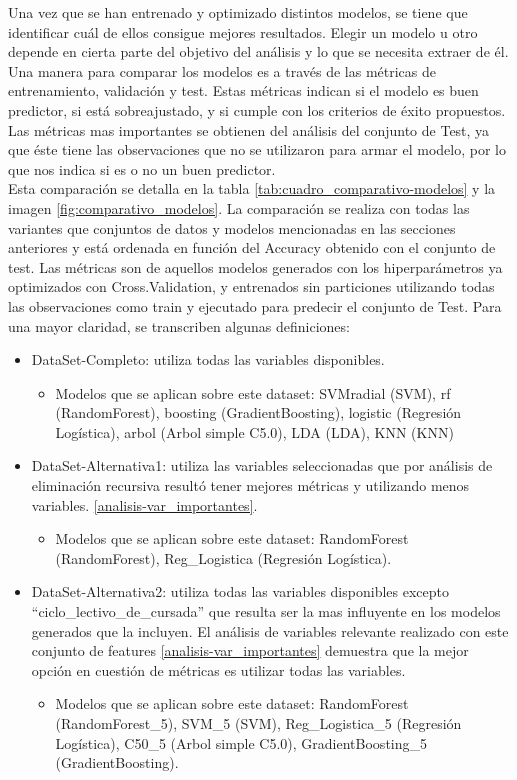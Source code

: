 Una vez que se han entrenado y optimizado distintos modelos, se tiene
que identificar cuál de ellos consigue mejores resultados. Elegir un modelo u otro depende en cierta parte del objetivo del análisis y lo que se necesita extraer de él. Una manera para comparar los modelos es a través de las métricas de entrenamiento, validación y test. Estas métricas indican si el modelo es buen predictor, si está sobreajustado, y si cumple con los criterios de éxito propuestos.\\

Las métricas mas importantes se obtienen del análisis del conjunto de Test, ya que éste tiene las observaciones que no se utilizaron para armar el modelo, por lo que nos indica si es o no un buen predictor.\\

Esta comparación se detalla en la tabla \ref{tab:cuadro_comparativo-modelos} y la imagen \ref{fig:comparativo_modelos}. La comparación se realiza con todas las variantes que conjuntos de datos y modelos mencionadas en las secciones anteriores y está ordenada en función del Accuracy obtenido con el conjunto de test. Las métricas son de aquellos modelos generados con los hiperparámetros ya optimizados con Cross.Validation, y entrenados sin particiones utilizando todas las observaciones como train y ejecutado para predecir el conjunto de Test. Para una mayor claridad, se transcriben algunas definiciones:

\begin{itemize}
	\item DataSet-Completo: utiliza todas las variables disponibles.
	\begin{itemize}
		\item Modelos que se aplican sobre este dataset: SVMradial (SVM), rf (RandomForest), boosting (GradientBoosting), logistic (Regresión Logística), arbol (Arbol simple C5.0), LDA (LDA), KNN (KNN)  
	\end{itemize}
	\item DataSet-Alternativa1: utiliza las variables seleccionadas que por análisis de eliminación recursiva resultó tener mejores métricas y utilizando menos variables. \ref{analisis-var_importantes}.
		\begin{itemize}
		\item Modelos que se aplican sobre este dataset: RandomForest (RandomForest), Reg\_Logistica (Regresión Logística).
	\end{itemize}
	\item DataSet-Alternativa2: utiliza todas las variables disponibles excepto ``ciclo\_lectivo\_de\_cursada'' que resulta ser la mas influyente en los modelos generados que la incluyen. El análisis de variables relevante realizado con este conjunto de features \ref{analisis-var_importantes} demuestra que la mejor opción en cuestión de métricas es utilizar todas las variables.
			\begin{itemize}
		\item Modelos que se aplican sobre este dataset: RandomForest (RandomForest\_5), SVM\_5 (SVM), Reg\_Logistica\_5 (Regresión Logística), C50\_5 (Arbol simple C5.0), GradientBoosting\_5 (GradientBoosting).
	\end{itemize}
\end{itemize}

